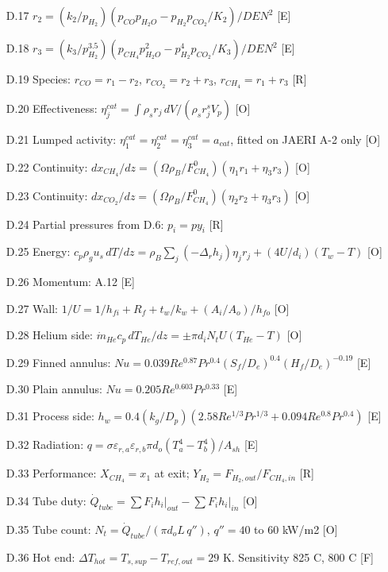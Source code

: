 \begin{enumerate}[leftmargin=1.4cm,itemsep=0pt,topsep=2pt,parsep=0pt]
\item[D.17] $r_2=(k_2/p_{H_2})(p_{CO}p_{H_2O}-p_{H_2}p_{CO_2}/K_2)/DEN^2$ {\footnotesize [E]}
\item[D.18] $r_3=(k_3/p_{H_2}^{3.5})(p_{CH_4}p_{H_2O}^2-p_{H_2}^4p_{CO_2}/K_3)/DEN^2$ {\footnotesize [E]}
\item[D.19] Species: $r_{CO}=r_1-r_2$, $r_{CO_2}=r_2+r_3$, $r_{CH_4}=r_1+r_3$ {\footnotesize [R]}
\item[D.20] Effectiveness: $\eta_j^{cat}=\int\rho_sr_j\,dV/(\rho_sr_j^sV_p)$ {\footnotesize [O]}
\item[D.21] Lumped activity: $\eta_1^{cat}=\eta_2^{cat}=\eta_3^{cat}=a_{cat}$, fitted on JAERI A-2 only {\footnotesize [O]}
\item[D.22] Continuity: $dx_{CH_4}/dz=(\Omega\rho_B/F^0_{CH_4})(\eta_1r_1+\eta_3r_3)$ {\footnotesize [O]}
\item[D.23] Continuity: $dx_{CO_2}/dz=(\Omega\rho_B/F^0_{CH_4})(\eta_2r_2+\eta_3r_3)$ {\footnotesize [O]}
\item[D.24] Partial pressures from D.6: $p_i=py_i$ {\footnotesize [R]}
\item[D.25] Energy: $c_p\rho_gu_s\,dT/dz=\rho_B\sum_j(-\Delta_rh_j)\eta_jr_j+(4U/d_i)(T_w-T)$ {\footnotesize [O]}
\item[D.26] Momentum: A.12 {\footnotesize [E]}
\item[D.27] Wall: $1/U=1/h_{fi}+R_f+t_w/k_w+(A_i/A_o)/h_{fo}$ {\footnotesize [O]}
\item[D.28] Helium side: $\dot m_{He}c_p\,dT_{He}/dz=\pm\pi d_iN_tU(T_{He}-T)$ {\footnotesize [O]}
\item[D.29] Finned annulus: $Nu=0.039Re^{0.87}Pr^{0.4}(S_f/D_e)^{0.4}(H_f/D_e)^{-0.19}$ {\footnotesize [E]}
\item[D.30] Plain annulus: $Nu=0.205Re^{0.603}Pr^{0.33}$ {\footnotesize [E]}
\item[D.31] Process side: $h_w=0.4(k_g/D_p)(2.58Re^{1/3}Pr^{1/3}+0.094Re^{0.8}Pr^{0.4})$ {\footnotesize [E]}
\item[D.32] Radiation: $q=\sigma\varepsilon_{r,a}\varepsilon_{r,b}\pi d_o(T_a^4-T_b^4)/A_{sh}$ {\footnotesize [E]}
\item[D.33] Performance: $X_{CH_4}=x_1$ at exit; $Y_{H_2}=F_{H_2,out}/F_{CH_4,in}$ {\footnotesize [R]}
\item[D.34] Tube duty: $\dot Q_{tube}=\sum F_ih_i\rvert_{out}-\sum F_ih_i\rvert_{in}$ {\footnotesize [O]}
\item[D.35] Tube count: $N_t=\dot Q_{tube}/(\pi d_oL\,q'')$, $q''=40$ to 60 kW/m2 {\footnotesize [O]}
\item[D.36] Hot end: $\Delta T_{hot}=T_{s,sup}-T_{ref,out}=29$ K. Sensitivity 825 C, 800 C {\footnotesize [F]}
\end{enumerate}
